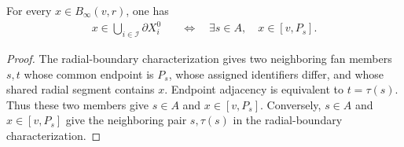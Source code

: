 \begin{lemma}
    \label{thm:area_law_initial_active_successor}
    \leanok
    For every $x\in B_\infty(v,r)$, one has
    \begin{align}
        x\in\bigcup_{i\in\mathcal I}\partial X_i^0
         & \quad\Longleftrightarrow\quad
        \exists s\in A,\quad x\in[v,P_s].
    \end{align}
\end{lemma}
\begin{proof}\leanok
    The radial-boundary characterization gives two neighboring
    fan members $s,t$ whose common endpoint is $P_s$, whose assigned
    identifiers differ, and whose shared radial segment contains $x$.
    Endpoint adjacency is equivalent to $t=\tau(s)$.
    Thus these two members give $s\in A$ and $x\in[v,P_s]$.
    Conversely, $s\in A$ and $x\in[v,P_s]$ give the neighboring pair
    $s,\tau(s)$ in the radial-boundary characterization.
\end{proof}
